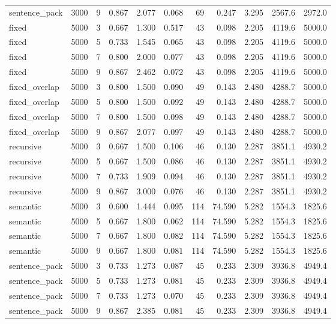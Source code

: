 \documentclass[pdflatex,sn-mathphys-num]{sn-jnl}
\theoremstyle{thmstyleone}
\theoremstyle{thmstyletwo}
\theoremstyle{thmstylethree}
\begin{document}
\begin{appendices}
\begin{table}
\begin{tabular}{@{}lrrrrrrrrrr@{}}
sentence\_pack & 3000 & 9 & 0.867 & 2.077 & 0.068 & 69 & 0.247 & 3.295 & 2567.6 & 2972.0 \\
fixed & 5000 & 3 & 0.667 & 1.300 & 0.517 & 43 & 0.098 & 2.205 & 4119.6 & 5000.0 \\
fixed & 5000 & 5 & 0.733 & 1.545 & 0.065 & 43 & 0.098 & 2.205 & 4119.6 & 5000.0 \\
fixed & 5000 & 7 & 0.800 & 2.000 & 0.077 & 43 & 0.098 & 2.205 & 4119.6 & 5000.0 \\
fixed & 5000 & 9 & 0.867 & 2.462 & 0.072 & 43 & 0.098 & 2.205 & 4119.6 & 5000.0 \\
fixed\_overlap & 5000 & 3 & 0.800 & 1.500 & 0.090 & 49 & 0.143 & 2.480 & 4288.7 & 5000.0 \\
fixed\_overlap & 5000 & 5 & 0.800 & 1.500 & 0.092 & 49 & 0.143 & 2.480 & 4288.7 & 5000.0 \\
fixed\_overlap & 5000 & 7 & 0.800 & 1.500 & 0.098 & 49 & 0.143 & 2.480 & 4288.7 & 5000.0 \\
fixed\_overlap & 5000 & 9 & 0.867 & 2.077 & 0.097 & 49 & 0.143 & 2.480 & 4288.7 & 5000.0 \\
recursive & 5000 & 3 & 0.667 & 1.500 & 0.106 & 46 & 0.130 & 2.287 & 3851.1 & 4930.2 \\
recursive & 5000 & 5 & 0.667 & 1.500 & 0.086 & 46 & 0.130 & 2.287 & 3851.1 & 4930.2 \\
recursive & 5000 & 7 & 0.733 & 1.909 & 0.094 & 46 & 0.130 & 2.287 & 3851.1 & 4930.2 \\
recursive & 5000 & 9 & 0.867 & 3.000 & 0.076 & 46 & 0.130 & 2.287 & 3851.1 & 4930.2 \\
semantic & 5000 & 3 & 0.600 & 1.444 & 0.095 & 114 & 74.590 & 5.282 & 1554.3 & 1825.6 \\
semantic & 5000 & 5 & 0.667 & 1.800 & 0.062 & 114 & 74.590 & 5.282 & 1554.3 & 1825.6 \\
semantic & 5000 & 7 & 0.667 & 1.800 & 0.082 & 114 & 74.590 & 5.282 & 1554.3 & 1825.6 \\
semantic & 5000 & 9 & 0.667 & 1.800 & 0.081 & 114 & 74.590 & 5.282 & 1554.3 & 1825.6 \\
sentence\_pack & 5000 & 3 & 0.733 & 1.273 & 0.087 & 45 & 0.233 & 2.309 & 3936.8 & 4949.4 \\
sentence\_pack & 5000 & 5 & 0.733 & 1.273 & 0.081 & 45 & 0.233 & 2.309 & 3936.8 & 4949.4 \\
sentence\_pack & 5000 & 7 & 0.733 & 1.273 & 0.070 & 45 & 0.233 & 2.309 & 3936.8 & 4949.4 \\
sentence\_pack & 5000 & 9 & 0.867 & 2.385 & 0.081 & 45 & 0.233 & 2.309 & 3936.8 & 4949.4 \\


\end{tabular}
\end{table}
\end{appendices}
\end{document}
